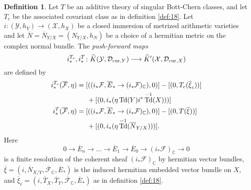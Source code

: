 \documentclass[10pt,twoside]{article}
\numberwithin{equation}{section}
\theoremstyle{plain}
\theoremstyle{definition}
\newtheorem{definition}[equation]{Definition}
\DeclareMathOperator{\Td}{Td}
\newcommand{\CC}{{\mathbb C}}
\newcommand{\D}{\text{{\rm cur}}}
\begin{document}
\begin{definition}\label{def:17} Let $T$ be an additive theory of
  singular Bott-Chern 
  classes, and let $T_{c}$ be the associated covariant class as in
  definition \ref{def:18}. 
  Let $i\colon (\mathcal{Y},h_{Y})\longrightarrow
(\mathcal{X},h_{X})$ be a closed immersion of metrized arithmetic
varieties and let $\overline N=\overline N_{Y/X}=(N_{Y/X},h_{N})$ be a
choice of a
hermitian metric on the complex normal bundle. The 
\emph{push-forward maps}
\begin{displaymath}
  i^{T_{c}}_{\ast}, i^{T}_{\ast}\colon \widehat
  K(\mathcal{Y},\mathcal{D}_{\D,Y})\longrightarrow  
  \widehat K'(\mathcal{X},\mathcal{D}_{\D,X})
\end{displaymath}
are defined by
\begin{align}
i^{T_{c}}_{\ast} (\overline{\mathcal{F}},\eta)
&= [((i_{\ast}\mathcal{F},\overline{E}_{\ast}\to
(i_{\ast}\mathcal{F})_{\CC}) ,0)]-[(0,T_{c}(\overline{\xi}_{c}))]\notag\\
&\phantom{AA}
+[(0,i_{\ast}(\eta\Td(Y) i^*\Td^{-1}(X)))]\label{eq:66}\\
i^{T}_{\ast}(\overline{\mathcal{F}},\eta)&=
[((i_{\ast}\mathcal{F},\overline{E}_{\ast}\to
(i_{\ast}\mathcal{F})_{\CC}) ,0)]-[(0,T(\overline{\xi}))]\notag
\\
&\phantom{AA}+[(0,i_{\ast}(\eta\Td^{-1}(\overline N_{Y/X})))].
\label{eq:91}
\end{align}
Here
$$0\rightarrow\overline{E}_n\rightarrow\ldots\rightarrow
\overline{E}_1\rightarrow\overline{E}_0\rightarrow
(i_*\mathcal{F})_{\mathbb{C}}\rightarrow 0$$ is a finite resolution of
the coherent 
sheaf $(i_*\mathcal{F})_{\CC}$ by hermitian vector bundles, 
$\overline{\xi}=
(i,\overline{N}_{X/Y},
\overline{\mathcal{F}}_{\mathbb{C}},\overline{E}_*)$  
is the induced hermitian embedded vector bundle on $X$, and
$\overline{\xi}_{c}=
(i,\overline T_{X}, \overline T_{Y},
\overline{\mathcal{F}}_{\mathbb{C}},\overline{E}_*)$ as in definition
\ref{def:18}.


\end{definition}
\end{document}
